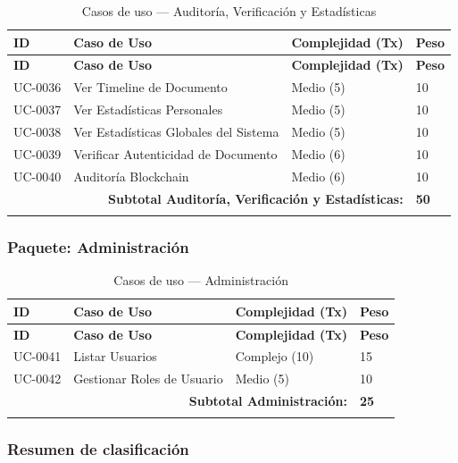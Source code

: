 \documentclass[11pt, a4paper]{article}
\begin{document}
\begin{longtable}{|p{1.8cm}|p{6.5cm}|p{3cm}|p{1.5cm}|}
\hline
\textbf{ID} & \textbf{Caso de Uso} & \textbf{Complejidad (Tx)} & \textbf{Peso} \\
\hline
\endfirsthead
\hline
\textbf{ID} & \textbf{Caso de Uso} & \textbf{Complejidad (Tx)} & \textbf{Peso} \\
\hline
\endhead
UC-0036 & Ver Timeline de Documento & Medio (5) & 10 \\
\hline
UC-0037 & Ver Estadísticas Personales & Medio (5) & 10 \\
\hline
UC-0038 & Ver Estadísticas Globales del Sistema & Medio (5) & 10 \\
\hline
UC-0039 & Verificar Autenticidad de Documento & Medio (6) & 10 \\
\hline
UC-0040 & Auditoría Blockchain & Medio (6) & 10 \\
\hline
\multicolumn{3}{|r|}{\textbf{Subtotal Auditoría, Verificación y Estadísticas:}} & \textbf{50} \\
\hline
\caption{Casos de uso --- Auditoría, Verificación y Estadísticas}\label{tab:uc-auditoria}
\end{longtable}

\subsubsection*{Paquete: Administración}

\begin{longtable}{|p{1.8cm}|p{6.5cm}|p{3cm}|p{1.5cm}|}
\hline
\textbf{ID} & \textbf{Caso de Uso} & \textbf{Complejidad (Tx)} & \textbf{Peso} \\
\hline
\endfirsthead
\hline
\textbf{ID} & \textbf{Caso de Uso} & \textbf{Complejidad (Tx)} & \textbf{Peso} \\
\hline
\endhead
UC-0041 & Listar Usuarios & Complejo (10) & 15 \\
\hline
UC-0042 & Gestionar Roles de Usuario & Medio (5) & 10 \\
\hline
\multicolumn{3}{|r|}{\textbf{Subtotal Administración:}} & \textbf{25} \\
\hline
\caption{Casos de uso --- Administración}\label{tab:uc-administracion}
\end{longtable}

\subsubsection*{Resumen de clasificación}
\end{document}
